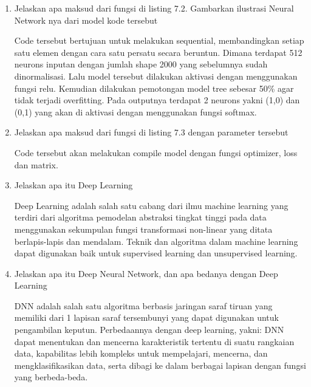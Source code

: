 \begin{enumerate}
\item Jelaskan apa maksud dari fungsi di listing 7.2. Gambarkan ilustrasi Neural Network nya dari model kode tersebut \par

Code tersebut bertujuan untuk melakukan sequential, membandingkan setiap satu elemen dengan cara satu persatu secara beruntun. Dimana terdapat 512 neurons inputan dengan jumlah shape 2000 yang sebelumnya sudah dinormalisasi. Lalu model tersebut dilakukan aktivasi dengan menggunakan fungsi relu. Kemudian dilakukan pemotongan model tree sebesar 50\% agar tidak terjadi overfitting. Pada outputnya terdapat 2 neurons yakni (1,0) dan (0,1) yang akan di aktivasi dengan menggunakan fungsi softmax.

\item Jelaskan apa maksud dari fungsi di listing 7.3 dengan parameter tersebut \par

Code tersebut akan melakukan compile model dengan fungsi optimizer, loss dan matrix.

\item Jelaskan apa itu Deep Learning \par
Deep Learning adalah salah satu cabang dari ilmu machine learning yang terdiri dari algoritma pemodelan abstraksi tingkat tinggi pada data menggunakan sekumpulan fungsi transformasi non-linear yang ditata berlapis-lapis dan mendalam. Teknik dan algoritma dalam machine learning dapat digunakan baik untuk supervised learning dan unsupervised learning.

\item Jelaskan apa itu Deep Neural Network, dan apa bedanya dengan Deep Learning \par
DNN adalah salah satu algoritma berbasis jaringan saraf tiruan yang memiliki dari 1 lapisan saraf tersembunyi yang dapat digunakan untuk pengambilan keputun. Perbedaannya dengan deep learning, yakni: DNN dapat menentukan dan mencerna karakteristik tertentu di suatu rangkaian data, kapabilitas lebih kompleks untuk mempelajari, mencerna, dan mengklasifikasikan data, serta dibagi ke dalam berbagai lapisan dengan fungsi yang berbeda-beda.


\end{enumerate}

